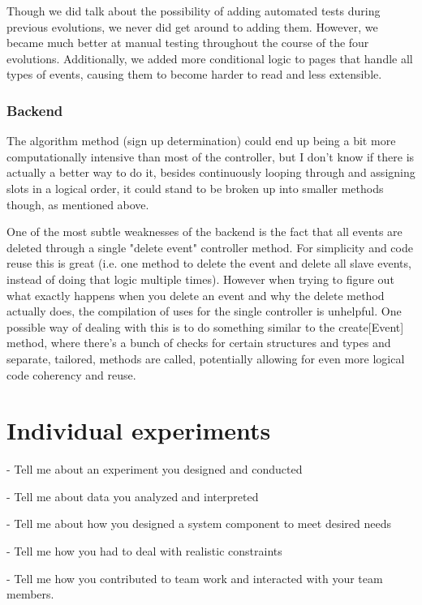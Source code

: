 \documentclass{article}
\begin{document}
Though we did talk about the possibility of adding automated tests during previous evolutions, we never did get around to adding them. However, we became much better at manual testing throughout the course of the four evolutions. Additionally, we added more conditional logic to pages that handle all types of events, causing them to become harder to read and less extensible.

\subsubsection{Backend}
The algorithm method (sign up determination) could end up being a bit more computationally intensive than most of the controller, but I don't know if there is actually a better way to do it, besides continuously looping through and assigning slots in a logical order, it could stand to be broken up into smaller methods though, as mentioned above.

One of the most subtle weaknesses of the backend is the fact that all events are deleted through a single "delete event" controller method. For simplicity and code reuse this is great (i.e. one method to delete the event and delete all slave events, instead of doing that logic multiple times). However when trying to figure out what exactly happens when you delete an event and why the delete method actually does, the compilation of uses for the single controller is unhelpful. One possible way of dealing with this is to do something similar to the create[Event] method, where there's a bunch of checks for certain structures and types and separate, tailored, methods are called, potentially allowing for even more logical code coherency and reuse.

\section{Individual experiments}

- Tell me about an experiment you designed and conducted

- Tell me about data you analyzed and interpreted 

- Tell me about how you designed a system component to meet desired needs

- Tell me how you had to deal with realistic constraints

- Tell me how you contributed to team work and interacted with your team members.
 
 
\end{document}
